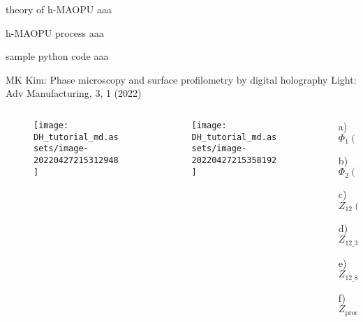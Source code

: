 \documentclass[t, aspectratio=169]{beamer}
\begin{document}
\begin{frame}{theory of h-MAOPU}
aaa
\end{frame}


\begin{frame}{h-MAOPU process}
aaa
\end{frame}


\begin{frame}{sample python code}
aaa
\end{frame}


\begin{frame}{MK Kim: Phase microscopy and surface profilometry by digital holography}
	\vspace{-3 mm}
	\small Light: Adv Manufacturing, 3, 1 (2022)
	\begin{columns}
		\begin{column}{.47\textwidth}
			\begin{figure}
				\texttt{[image: DH\_tutorial\_md.assets/image-20220427215312948]}
			\end{figure}
		\end{column}
		\begin{column}{.28\textwidth}
			\begin{figure}
				\texttt{[image: DH\_tutorial\_md.assets/image-20220427215358192]}
			\end{figure}
		\end{column}
		\begin{column}{.25\textwidth}
			\begin{itemize}
				\item[a) ] $ \Phi_1(x,y) $
				\item[b) ] $ \Phi_2(x,y) $
				\item[c) ] $ Z_{12}(x,y) $
				\item[d) ] $ Z_{12\_3}(x,y) $
				\item[e) ] $ Z_{12\_8}(x,y) $
				\item[f) ] $ Z_{\textrm{proc}}(x,y) $
			\end{itemize}
		\end{column}
	\end{columns}
\end{frame}
\end{document}
